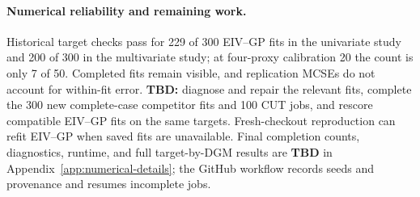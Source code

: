 \paragraph{Numerical reliability and remaining work.}
Historical target checks pass for 229 of 300 EIV--GP fits in the univariate study and 200 of 300 in the multivariate study; at four-proxy calibration 20 the count is only 7 of 50. Completed fits remain visible, and replication MCSEs do not account for within-fit error. \textbf{TBD:} diagnose and repair the relevant fits, complete the 300 new complete-case competitor fits and 100 CUT jobs, and rescore compatible EIV--GP fits on the same targets. Fresh-checkout reproduction can refit EIV--GP when saved fits are unavailable. Final completion counts, diagnostics, runtime, and full target-by-DGM results are \textbf{TBD} in Appendix~\ref{app:numerical-details}; the GitHub workflow records seeds and provenance and resumes incomplete jobs.
